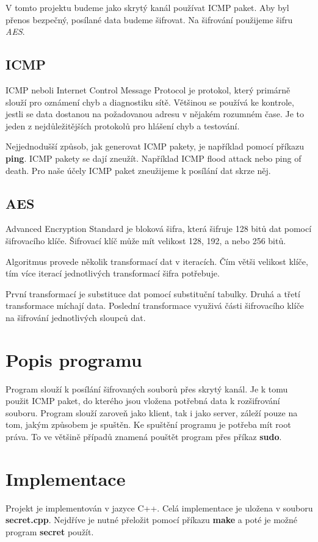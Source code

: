 \documentclass[11pt, a4paper]{article}
\begin{document}
V tomto projektu budeme jako skrytý kanál používat ICMP paket. Aby byl přenos bezpečný, posílané data budeme šifrovat. Na šifrování použijeme šifru \emph{AES}.

\subsection{ICMP}
ICMP neboli Internet Control Message Protocol je protokol, který primárně slouží pro oznámení chyb a diagnostiku sítě. Většinou se používá ke kontrole, jestli se data dostanou na požadovanou adresu v nějakém rozumném čase. Je to jeden z nejdůležitějších protokolů pro hlášení chyb a testování.

Nejjednodušší způsob, jak generovat ICMP pakety, je například pomocí příkazu \textbf{ping}. 
ICMP pakety se dají zneužít. Například ICMP flood attack nebo ping of death. Pro naše účely ICMP paket zneužijeme k posílání dat skrze něj.

\subsection{AES}
Advanced Encryption Standard je bloková šifra, která šifruje 128 bitů dat pomocí šifrovacího klíče. Šifrovací klíč může mít velikost 128, 192, a nebo 256 bitů. 

Algoritmus provede několik transformací dat v iteracích. Čím větši velikost klíče, tím více iterací jednotlivých transformací šifra potřebuje. 

První transformací je substituce dat pomocí substituční tabulky. Druhá a třetí transformace míchají data. Poslední transformace využivá části šifrovacího klíče na šifrování jednotlivých sloupců dat. 


\section{Popis programu}
Program slouží k posílání šifrovaných souborů přes skrytý kanál. Je k tomu použit ICMP paket, do kterého jsou vložena potřebná data k rozšifrování souboru. Program slouží zaroveň jako klient, tak i jako server, záleží pouze na tom, jakým způsobem je spuštěn. Ke spuštění programu je potřeba mít root práva. To ve většině případů znamená pouštět program přes příkaz \textbf{sudo}.


\section{Implementace}
Projekt je implementován v jazyce C++. Celá implementace je uložena  v souboru \textbf{secret.cpp}.
Nejdříve je nutné přeložit pomocí příkazu \textbf{make} a poté je možné program \textbf{secret} použít. 
\end{document}
